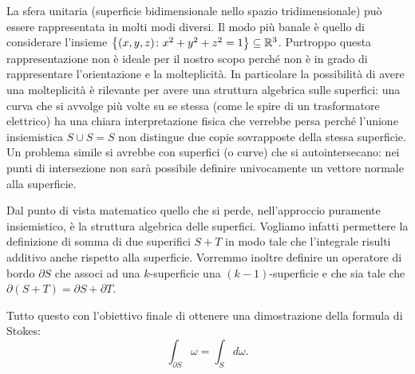 La sfera unitaria (superficie bidimensionale nello spazio tridimensionale) può essere rappresentata in molti modi diversi. 
Il modo più banale è quello di considerare l'insieme ${\left\{ (x,y,z)\colon x^2+y^2+z^2=1 \right\}}\subseteq {\mathbb R}^3$.
Purtroppo questa rappresentazione non è ideale per il nostro scopo perché non è in grado di rappresentare 
l'orientazione e la molteplicità. 
In particolare la possibilità di avere una molteplicità è rilevante per avere una struttura algebrica sulle 
superfici: una curva che si avvolge più volte su se stessa (come le spire di un trasformatore elettrico) 
ha una chiara interpretazione fisica che verrebbe persa perché l'unione insiemistica $S \cup S = S$
non distingue due copie sovrapposte della stessa superficie. 
Un problema simile si avrebbe con superfici (o curve) che si autointersecano: 
nei punti di intersezione non sarà possibile definire univocamente un vettore normale alla superficie.

Dal punto di vista matematico quello che si perde, nell'approccio puramente insiemistico, è la struttura 
algebrica delle superfici. Vogliamo infatti permettere la definizione di somma di due superifici $S+T$ 
in modo tale che l'integrale risulti additivo anche rispetto alla superficie. 
Vorremmo inoltre definire un operatore di bordo $\partial S$ che associ ad una $k$-superficie una $(k-1)$-superficie
e che sia tale che $\partial(S+T) = \partial S + \partial T$.

Tutto questo con l'obiettivo finale di ottenere una dimostrazione della formula di Stokes:
\[
 \int_{\partial S} \omega = \int_S d \omega.
\]
 